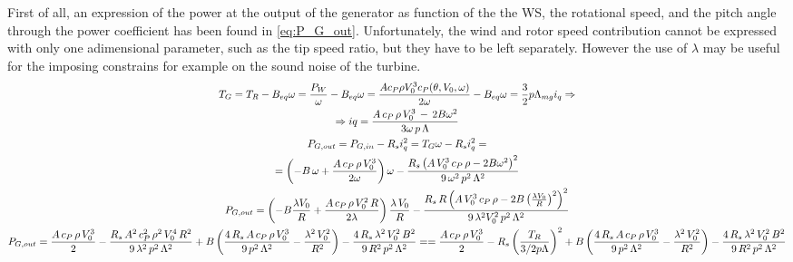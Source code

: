 First of all, an expression of the power at the output of the generator as function of the the WS, the rotational speed, and the pitch angle through the power coefficient has been found in \autoref{eq:P_G_out}.  Unfortunately, the wind and rotor speed contribution cannot be expressed with only one adimensional parameter, such as the tip speed ratio, but they have to be left separately. However the use of $\lambda$ may be useful for the imposing constrains for example on the sound noise of the turbine.
\begin{gather} 
  T_G = T_R - B_{eq}\omega = \frac{P_W}{\omega} - B_{eq}\omega = \frac{A c_P \rho V_0^3 c_P(\theta, V_0, \omega)}{2\omega} - B_{eq}\omega = \frac{3}{2}p\Lambda_{mg}i_q \Rightarrow \\ \notag
  \Rightarrow iq = \frac{A \, c_P \, \rho \, V_0^3 \,-\,2B\omega^2}{3\omega\,p\,\Lambda} \\ 
  P_{G, out} = P_{G, in} - R_s i_q^2 = T_G \omega - R_s i_q^2 = \\ \notag
   = \left(-B\,\omega + \frac{A\,c_P\,\rho\,V_0^3}{2\omega}\right)\omega - \frac{R_s\left(A\,V_0^3\,c_P\,\rho - 2B\omega^2\right)^2}{9\,\omega^2\,p^2\,\Lambda^2} \label{eq:P_G_out} \\
   P_{G, out} = \left(-B\frac{\lambda V_0}{R} + \frac{A\,c_P\,\rho\,V_0^2\,R}{2\lambda}\right)\frac{\lambda \, V_0}{R} - \frac{R_s\,R\left(A\,V_0^3\,c_P\,\rho - 2B\left(\frac{\lambda V_0}{R}\right)^2\right)^2}{9\,\lambda^2V_0^2\,p^2\,\Lambda^2}\label{eq:P_G_out_lambda}\\
   P_{G, out} = \frac{A\,c_P\,\rho\,V_0^3}{2} - \frac{R_s\,A^2\,c_P^2\,\rho^2\,V_0^4\,R^2}{9\,\lambda^2\,p^2\,\Lambda^2} + B\left(\frac{4\,R_s\,A\,c_P\,\rho\,V_0^3}{9\,p^2\,\Lambda^2} - \frac{\lambda^2\,V_0^2}{R^2}\right) - \frac{4\,R_s\,\lambda^2\,V_0^2\,B^2}{9\,R^2\,p^2\,\Lambda^2} = \notag
   = \frac{A\,c_P\,\rho\,V_0^3}{2} - R_s \left(\frac{T_R}{3/2p\Lambda}\right)^2 + B\left(\frac{4\,R_s\,A\,c_P\,\rho\,V_0^3}{9\,p^2\,\Lambda^2} - \frac{\lambda^2\,V_0^2}{R^2}\right) - \frac{4\,R_s\,\lambda^2\,V_0^2\,B^2}{9\,R^2\,p^2\,\Lambda^2} \label{eq:P_G_out_damping}
\end{gather}

